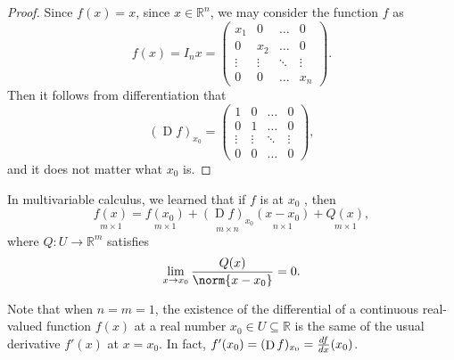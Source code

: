 \documentclass[notoc,notitlepage]{tufte-book}
\DeclareMathOperator{\D}{D}
\begin{document}
\begin{proof}
  Since $f(x) = x$, since $x \in \mathbb{R}^n$, we may consider the function $f$ as
  \begin{equation*}
    f(x) = I_n x = \begin{pmatrix}
      x_1    & 0      & \hdots & 0 \\
      0      & x_2    & \hdots & 0 \\
      \vdots & \vdots & \ddots & \vdots \\
      0      & 0      & \hdots & x_n
    \end{pmatrix}.
  \end{equation*}
  Then it follows from differentiation that
  \begin{equation*}
    (\D f)_{x_0} = \begin{pmatrix}
      1      & 0      & \hdots & 0 \\
      0      & 1      & \hdots & 0 \\
      \vdots & \vdots & \ddots & \vdots \\
      0      & 0      & \hdots & 0
    \end{pmatrix},
  \end{equation*}
  and it does not matter what $x_0$ is.
\end{proof}

\begin{note}
  In multivariable calculus, we learned that if $f$ is  at $x_0$
  , then
  \begin{equation*}
    \underset{m \times 1}{f(x)}
      = \underset{m \times 1}{f(x_0)}
        + \underset{m \times n}{(\D f)_{x_0}} \underset{n \times 1}{(x - x_0)}
        + \underset{m \times 1}{Q(x)},
  \end{equation*}
  where $Q : U \to \mathbb{R}^m$ satisfies
  \begin{equation*}
    \lim_{x \to x_0} \frac{Q(x)}{\norm{x - x_0}} = 0.
  \end{equation*}
\end{note}

\begin{note}
  Note that when $n = m = 1$, the existence of the differential of a continuous
  real-valued function $f(x)$ at a real number $x_0 \in U \subseteq \mathbb{R}$
  is the same of the usual derivative $f'(x)$ at $x = x_0$. In fact,
  $f'(x_0) = (\D f)_{x_0} = \frac{\dif{f}}{\dif{x}}(x_0)$.
\end{note}
\end{document}
